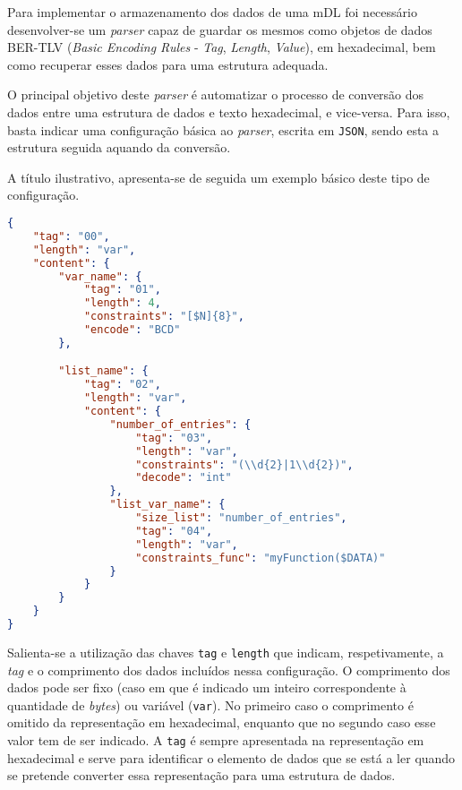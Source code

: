 Para implementar o armazenamento dos dados de uma mDL foi necessário desenvolver-se um \textit{parser} capaz de guardar os mesmos como objetos de dados BER-TLV (\textit{Basic Encoding
Rules} - \textit{Tag}, \textit{Length}, \textit{Value}), em hexadecimal, bem como recuperar esses dados para uma estrutura adequada. 

O principal objetivo deste \textit{parser} é automatizar o processo de conversão dos dados entre uma estrutura de dados e texto hexadecimal, e vice-versa. Para isso, basta indicar uma configuração básica ao \textit{parser}, escrita em \texttt{JSON}, sendo esta a estrutura seguida aquando da conversão.

A título ilustrativo, apresenta-se de seguida um exemplo básico deste tipo de configuração.

\begin{lstlisting}[language=json]
{
    "tag": "00",
    "length": "var",
    "content": {
        "var_name": {
            "tag": "01",
            "length": 4,
            "constraints": "[$N]{8}",
            "encode": "BCD"
        },

        "list_name": {
            "tag": "02",
            "length": "var",
            "content": {
                "number_of_entries": {
                    "tag": "03",
                    "length": "var",
                    "constraints": "(\\d{2}|1\\d{2})",
                    "decode": "int"
                },
                "list_var_name": {
                    "size_list": "number_of_entries",
                    "tag": "04",
                    "length": "var",
                    "constraints_func": "myFunction($DATA)"
                }
            }
        }
    }
}
\end{lstlisting}

\vspace{0.5cm}

Salienta-se a utilização das chaves \texttt{tag} e \texttt{length} que indicam, respetivamente, a \textit{tag} e o comprimento dos dados incluídos nessa configuração. O comprimento dos dados pode ser fixo (caso em que é indicado um inteiro correspondente à quantidade de \textit{bytes}) ou variável (\texttt{var}). No primeiro caso o comprimento é omitido da representação em hexadecimal, enquanto que no segundo caso esse valor tem de ser indicado. A \texttt{tag} é sempre apresentada na representação em hexadecimal e serve para identificar o elemento de dados que se está a ler quando se pretende converter essa representação para uma estrutura de dados.

